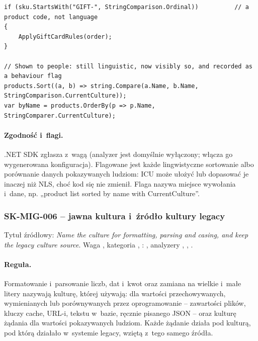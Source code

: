 \begin{lstlisting}
if (sku.StartsWith("GIFT-", StringComparison.Ordinal))          // a product code, not language
{
    ApplyGiftCardRules(order);
}

// Shown to people: still linguistic, now visibly so, and recorded as a behaviour flag
products.Sort((a, b) => string.Compare(a.Name, b.Name, StringComparison.CurrentCulture));
var byName = products.OrderBy(p => p.Name, StringComparer.CurrentCulture);
\end{lstlisting}

\paragraph{Zgodność i~flagi.} .NET SDK zgłasza  z~wagą
 (analyzer jest domyślnie wyłączony; włącza go wygenerowana konfiguracja).
Flagowane jest każde lingwistyczne sortowanie albo porównanie danych pokazywanych ludziom:
ICU może ułożyć lub dopasować je inaczej niż NLS, choć kod się nie zmienił. Flaga nazywa
miejsce wywołania i~dane, np. „product list sorted by name with CurrentCulture”.


\subsubsection{SK-MIG-006 -- jawna kultura i~źródło kultury legacy}\label{sec:standardy-sk-mig-006}

Tytuł źródłowy: \emph{Name the culture for formatting, parsing and casing, and keep the
legacy culture source}. Waga , kategoria ,
: , analyzery , ,
.

\paragraph{Reguła.} Formatowanie i~parsowanie liczb, dat i~kwot oraz zamiana na wielkie
i~małe litery nazywają kulturę, której używają:  dla
wartości przechowywanych, wymienianych lub porównywanych przez oprogramowanie -- zawartości
plików, kluczy cache, URL-i, tekstu w~bazie, ręcznie pisanego JSON -- oraz kulturę żądania
dla wartości pokazywanych ludziom. Każde żądanie działa pod kulturą, pod którą działało
w~systemie legacy, wziętą z~tego samego źródła.

